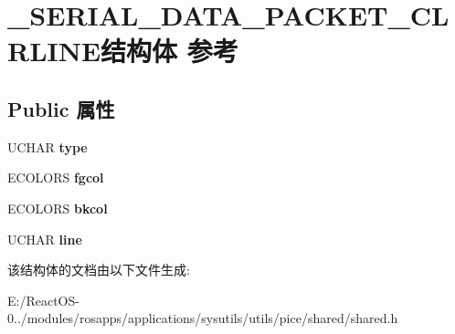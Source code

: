 \hypertarget{struct___s_e_r_i_a_l___d_a_t_a___p_a_c_k_e_t___c_l_r_l_i_n_e}{}\section{\+\_\+\+S\+E\+R\+I\+A\+L\+\_\+\+D\+A\+T\+A\+\_\+\+P\+A\+C\+K\+E\+T\+\_\+\+C\+L\+R\+L\+I\+N\+E结构体 参考}
\label{struct___s_e_r_i_a_l___d_a_t_a___p_a_c_k_e_t___c_l_r_l_i_n_e}
\subsection*{Public 属性}
\begin{DoxyCompactItemize}
\item 
\mbox{\label{struct___s_e_r_i_a_l___d_a_t_a___p_a_c_k_e_t___c_l_r_l_i_n_e_ad9240cf954cffc31396eb51465627d2c}} 
U\+C\+H\+AR {\bfseries type}
\item 
\mbox{\label{struct___s_e_r_i_a_l___d_a_t_a___p_a_c_k_e_t___c_l_r_l_i_n_e_a8eba967409aa8489858b48fdb4181726}} 
E\+C\+O\+L\+O\+RS {\bfseries fgcol}
\item 
\mbox{\label{struct___s_e_r_i_a_l___d_a_t_a___p_a_c_k_e_t___c_l_r_l_i_n_e_aef4737bde4271cd912f58435c6514bb8}} 
E\+C\+O\+L\+O\+RS {\bfseries bkcol}
\item 
\mbox{\label{struct___s_e_r_i_a_l___d_a_t_a___p_a_c_k_e_t___c_l_r_l_i_n_e_ad2059aa88349d41849e455c7dafb2f23}} 
U\+C\+H\+AR {\bfseries line}
\end{DoxyCompactItemize}


该结构体的文档由以下文件生成\+:\begin{DoxyCompactItemize}
\item 
E\+:/\+React\+O\+S-\/0../modules/rosapps/applications/sysutils/utils/pice/shared/shared.\+h\end{DoxyCompactItemize}

